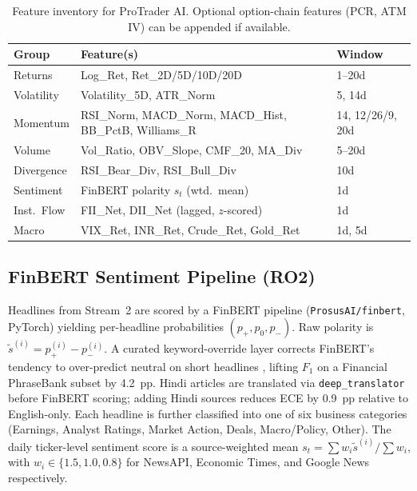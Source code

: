 \documentclass[12pt,a4paper]{article}
\begin{document}
\begin{table}[h]
\centering
\caption{Feature inventory for ProTrader AI. Optional option-chain features
(PCR, ATM IV) can be appended if available.}
\label{tab:features}
\footnotesize\setlength{\tabcolsep}{3pt}
\begin{tabular}{lll}
\toprule
\textbf{Group} & \textbf{Feature(s)} & \textbf{Window} \\
\midrule
Returns      & Log\_Ret, Ret\_2D/5D/10D/20D         & 1--20d \\
Volatility   & Volatility\_5D, ATR\_Norm             & 5, 14d \\
Momentum     & RSI\_Norm, MACD\_Norm, MACD\_Hist,
               BB\_PctB, Williams\_R                & 14, 12/26/9, 20d \\
Volume       & Vol\_Ratio, OBV\_Slope, CMF\_20, MA\_Div & 5--20d \\
Divergence   & RSI\_Bear\_Div, RSI\_Bull\_Div        & 10d \\
Sentiment    & FinBERT polarity $s_t$ (wtd.\ mean)   & 1d \\
Inst.\ Flow  & FII\_Net, DII\_Net (lagged, $z$-scored) & 1d \\
Macro        & VIX\_Ret, INR\_Ret, Crude\_Ret, Gold\_Ret & 1d, 5d \\
\bottomrule
\end{tabular}
\end{table}

\subsection{FinBERT Sentiment Pipeline (RO2)}

Headlines from Stream~2 are scored by a FinBERT pipeline \cite{r12}
(\texttt{ProsusAI/finbert}, PyTorch) yielding per-headline probabilities
$(p_+,p_0,p_-)$. Raw polarity is $\tilde{s}^{(i)}=p_+^{(i)}-p_-^{(i)}$.
A curated keyword-override layer corrects FinBERT's tendency to over-predict
neutral on short headlines \cite{r7}, lifting $F_1$ on a Financial PhraseBank
subset \cite{r35} by 4.2~pp. Hindi articles are translated via
\texttt{deep\_translator} before FinBERT scoring; adding Hindi sources reduces
ECE by 0.9~pp relative to English-only. Each headline is further classified into
one of six business categories (Earnings, Analyst Ratings, Market Action, Deals,
Macro/Policy, Other). The daily ticker-level sentiment score is a source-weighted
mean $s_t=\sum w_i\tilde{s}^{(i)}/\sum w_i$, with $w_i\!\in\!\{1.5,1.0,0.8\}$
for NewsAPI, Economic Times, and Google News respectively.
\end{document}
